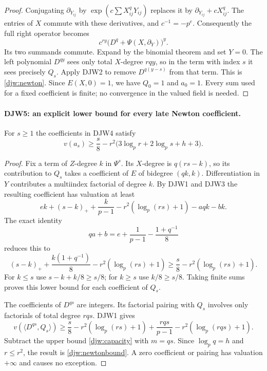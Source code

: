\documentclass[11pt,a4paper]{article}
\numberwithin{equation}{section}
\theoremstyle{remark}\newtheorem{remark}[theorem]{Remark}
\begin{document}
\begin{proof}
Conjugating $\partial_{Y_{ij}}$ by
$\exp(c\sum X_{ij}^qY_{ij})$ replaces it by
$\partial_{Y_{ij}}+cX_{ij}^q$.
The entries of $X$ commute with these derivatives, and
$c^{-1}=-p^e$.  Consequently the full right operator becomes
\[
 c^{ry}\bigl(D^q+\Psi(X,\partial_Y)\bigr)^y.
\]
Its two summands commute.  Expand by the binomial theorem and set
$Y=0$.  The left polynomial $D^{qy}$ sees only total $X$-degree
$rqy$, so in the term with index $s$ it sees precisely $Q_s$.
Apply DJW2 to remove $D^{q(y-s)}$ from that term.  This is
\eqref{djw:newton}.  Since $E(X,0)=1$, we have $Q_0=1$ and
$a_0=1$.  Every sum used for a fixed coefficient is finite; no
convergence in the valued field is needed.
\end{proof}

\paragraph{DJW5: an explicit lower bound for every late Newton coefficient.}
\label{claim:DJW5}
For $s\ge1$ the coefficients in DJW4 satisfy
\begin{equation}
 v(a_s)\ge
 \frac s8-r^2\bigl(3\log_p r+2\log_p s+h+3\bigr).
 \label{djw:newtonbound}
\end{equation}

\begin{proof}
Fix a term of $Z$-degree $k$ in $\Psi^s$.
Its $X$-degree is $q(rs-k)$, so its contribution to $Q_s$ takes
a coefficient of $E$ of bidegree $(qk,k)$.
Differentiation in $Y$ contributes a multiindex factorial of
degree $k$.  By DJW1 and DJW3 the resulting coefficient has
valuation at least
\[
 ek+(s-k)_++\frac{k}{p-1}
       -r^2(\log_p(rs)+1)-aqk-bk.
\]
The exact identity
\[
 qa+b=e+\frac1{p-1}-\frac{1+q^{-1}}8
\]
reduces this to
\[
 (s-k)_++\frac{k(1+q^{-1})}{8}
       -r^2(\log_p(rs)+1)
 \ge \frac s8-r^2(\log_p(rs)+1).
\]
For $k\le s$ use $s-k+k/8\ge s/8$; for $k\ge s$ use
$k/8\ge s/8$.  Taking finite sums proves this lower bound for
each coefficient of $Q_s$.

The coefficients of $D^{qs}$ are integers.  Its factorial pairing
with $Q_s$ involves only factorials of total degree $rqs$.
DJW1 gives
\[
 v(\langle D^{qs},Q_s\rangle)
 \ge \frac s8-r^2(\log_p(rs)+1)
       +\frac{rqs}{p-1}-r^2(\log_p(rqs)+1).
\]
Subtract the upper bound \eqref{djw:capacity} with $m=qs$.
Since $\log_pq=h$ and $r\le r^2$, the result is
\eqref{djw:newtonbound}.  A zero coefficient or pairing has
valuation $+\infty$ and causes no exception.
\end{proof}
\end{document}
